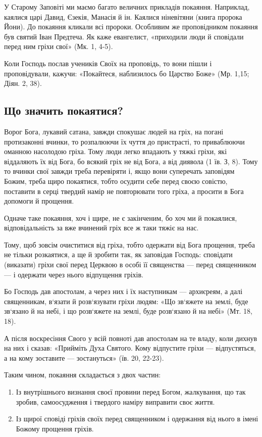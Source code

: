 \documentclass[main.tex]{subfiles}
\begin{document}
У Старому Заповіті ми маємо багато величних прикладів покаяння. Наприклад, каялися царі Давид, Єзекія, Манасія й ін. Каялися ніневітяни (книга пророка Йони). До покаяння кликали всі пророки. Особливим же проповідником покаяння був святий Іван Предтеча. Як каже евангелист, «приходили люди й сповідали перед ним гріхи свої» (Мк. 1, 4-5).

Коли Господь послав учеників Своїх на проповідь, то вони пішли і проповідували, кажучи: «Покайтеся, наблизилось бо Царство Боже» (Мр. 1,15; Діян. 2, 38).

\subsection{Що значить покаятися?}

Ворог Бога, лукавий сатана, завжди спокушає людей на гріх, на погані протизаконні вчинки, то розпалюючи їх чуття до пристрасті, то приваблюючи оманною насолодою гріха. Тому люди легко впадають у тяжкі гріхи, які віддаляють їх від Бога, бо всякий гріх не від Бога, а від диявола (1 їв. З, 8). Тому то вчинки свої завжди треба перевіряти і, якщо вони суперечать заповідям Божим, треба щиро покаятися, тобто осудити себе перед своєю совістю, поставити в серці твердий намір не повторювати того гріха, а просити в Бога допомоги й прощення.

Одначе таке покаяння, хоч і щире, не є закінченим, бо хоч ми й покаялися, відповідальність за вже вчинений гріх все ж таки тяжіє на нас.

Тому, щоб зовсім очиститися від гріха, тобто одержати від Бога прощення, треба не тільки розкаятися, а ще й зробити так, як заповідав Господь: сповідати (виказати) гріхи свої перед Церквою в особі її священства — перед священником — і одержати через нього відпущення гріхів.

Бо Господь дав апостолам, а через них і їх наступникам — архиєреям, а далі священникам, в`язати й розв`язувати гріхи людям: «Що зв`яжете на землі, буде зв`язано й на небі, і що розв`яжете на землі, буде розв`язано й на небі» (Мт. 18, 18).

А після воскресіння Свого у всій повноті дав апостолам на те владу, коли дихнув на них і сказав: «Прийміть Духа Святого. Кому відпустите гріхи — відпустяться, а на кому зоставите — зостануться» (їв. 20, 22-23).

Таким чином, покаяння складається з двох частин:
\begin{enumerate}
    \item Із внутрішнього визнання своєї провини перед Богом, жалкування, що так зробив, самоосудження і твердого наміру виправити своє життя.
    \item Із щирої сповіді гріхів своїх перед священником і одержання від нього в імені Божому прощення гріхів.
\end{enumerate}
\end{document}
